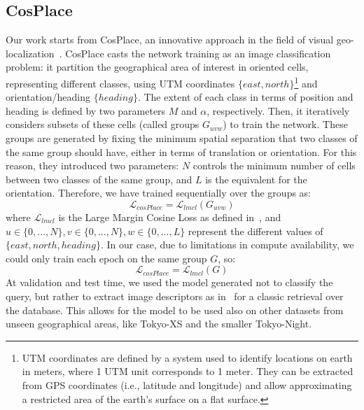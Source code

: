 \documentclass[10pt,twocolumn,letterpaper]{article}
\begin{document}
\subsection{CosPlace}
Our work starts from CosPlace, an innovative approach in the field of visual geo-localization~\cite{Berton_CVPR_2022_CosPlace}. CosPlace casts the network training as an image classification problem: it partition the geographical area of interest in oriented cells, representing different classes, using UTM coordinates $\{east,north\}$\footnote{UTM coordinates are defined by a system used to identify locations on earth in meters, where 1 UTM unit corresponds to 1 meter. They can be extracted from GPS coordinates (i.e., latitude and longitude) and allow approximating a restricted area of the earth’s surface on a flat surface.} and orientation/heading $\{heading\}$. The extent of each class in terms of position and heading is defined by two parameters $M$ and $\alpha$, respectively. Then, it iteratively considers subsets of these cells (called groups $G_{uvw}$) to train the network.
These groups are generated by fixing the minimum spatial separation that two classes of the same group should have, either in terms of translation or orientation. For this reason, they introduced two parameters: $N$ controls the minimum number of cells between two classes of the same group, and $L$ is the equivalent for the orientation.
Therefore, we have trained sequentially over the groups as:
\begin{equation}
  \mathcal{L}_{cosPlace} = \mathcal{L}_{lmcl}(G_{uvw})
  \label{eq:cosplace_full}
\end{equation}
where $\mathcal{L}_{lmcl}$ is the Large Margin Cosine Loss as defined in~\cite{cosface}, and $u \in \{0,...,N\}, v \in \{0,...,N\}, w \in \{0,...,L\}$ represent the different values of $\{east, north, heading\}$. In our case, due to limitations in compute availability, we could only train each epoch on the same group $G$, so:
\begin{equation}
  \mathcal{L}_{cosPlace} = \mathcal{L}_{lmcl}(G)
  \label{eq:cosplace_our}
\end{equation}
At validation and test time, we used the model generated not to classify the query, but rather to extract image descriptors as in~\cite{cosface} for a classic retrieval over the database. This allows for the model to be used also on other datasets from unseen geographical areas, like Tokyo-XS and the smaller Tokyo-Night.
\end{document}
